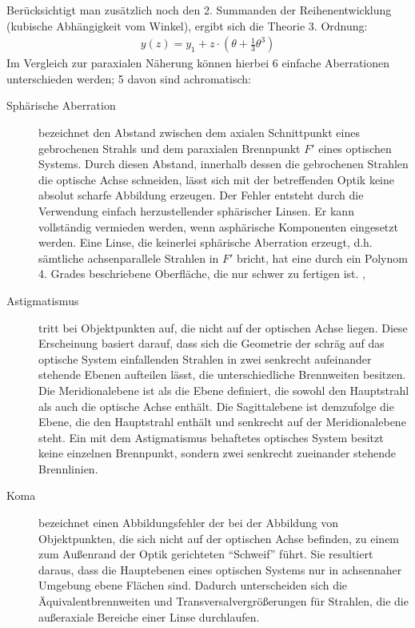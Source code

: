 Berücksichtigt man zusätzlich noch den 2. Summanden der Reihenentwicklung (kubische Abhängigkeit vom Winkel), ergibt sich die Theorie 3. Ordnung:
\begin{align*}
y(z)=y_1 + z \cdot \left( \theta + \frac{1}{3}\theta^3\right) 
\end{align*}
Im Vergleich zur paraxialen Näherung können hierbei 6 einfache Aberrationen unterschieden werden; 5 davon sind achromatisch:
\begin{description}
	\item[Sphärische Aberration] bezeichnet den Abstand zwischen dem axialen Schnittpunkt eines gebrochenen Strahls und dem paraxialen Brennpunkt $F'$ eines optischen Systems. Durch diesen Abstand, innerhalb dessen die gebrochenen Strahlen die optische Achse schneiden, lässt sich mit der betreffenden Optik keine absolut scharfe Abbildung erzeugen. Der Fehler entsteht durch die Verwendung einfach herzustellender sphärischer Linsen. Er kann vollständig vermieden werden, wenn asphärische Komponenten eingesetzt werden. Eine Linse, die keinerlei sphärische Aberration erzeugt, d.h. sämtliche achsenparallele Strahlen in $F'$ bricht, hat eine durch ein Polynom 4. Grades beschriebene Oberfläche, die nur schwer zu fertigen ist. \cite[416ff.]{hecht2014optik}, \cite[Vol. 1, 27-2ff.]{feynman2011flp}
	\item[Astigmatismus] tritt bei Objektpunkten auf, die nicht auf der optischen Achse liegen. Diese Erscheinung basiert darauf, dass sich die Geometrie der schräg auf das optische System einfallenden Strahlen in zwei senkrecht aufeinander stehende Ebenen aufteilen lässt, die unterschiedliche Brennweiten besitzen. Die Meridionalebene ist als die Ebene definiert, die sowohl den Hauptstrahl als auch die optische Achse enthält. Die Sagittalebene ist demzufolge die Ebene, die den Hauptstrahl enthält und senkrecht auf der Meridionalebene steht. Ein mit dem Astigmatismus behaftetes optisches System besitzt keine einzelnen Brennpunkt, sondern zwei senkrecht zueinander stehende Brennlinien. \cite[428ff.]{hecht2014optik}
	\item[Koma] bezeichnet einen Abbildungsfehler der bei der Abbildung von Objektpunkten, die sich nicht auf der optischen Achse befinden, zu einem zum Außenrand der Optik gerichteten "`Schweif"' führt. Sie resultiert daraus, dass die Hauptebenen eines optischen Systems nur in achsennaher Umgebung ebene Flächen sind. Dadurch unterscheiden sich die Äquivalentbrennweiten und Transversalvergrößerungen für Strahlen, die die außeraxiale Bereiche einer Linse durchlaufen. \cite[423ff.]{hecht2014optik}

\end{description}
